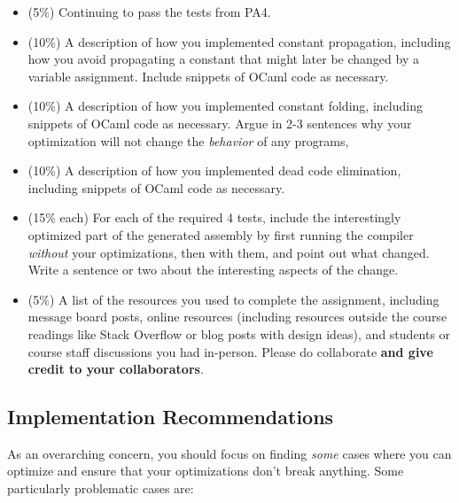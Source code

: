 \documentclass[10pt, oneside]{article}
\begin{document}
\begin{itemize}

  \item (5\%) Continuing to pass the tests from PA4.

  \item (10\%) A description of how you implemented constant propagation,
  including how you avoid propagating a constant that might later be changed
  by a variable assignment. Include snippets of OCaml code as necessary.

  \item (10\%) A description of how you implemented constant folding, including
  snippets of OCaml code as necessary. Argue in 2-3 sentences why your
  optimization will not change the {\it behavior} of any programs, 

  \item (10\%) A description of how you implemented dead code elimination,
  including snippets of OCaml code as necessary.

  \item (15\% each) For each of the required 4 tests, include the
  interestingly optimized part of the generated assembly by first running the
  compiler {\it without} your optimizations, then with them, and point out
  what changed. Write a sentence or two about the interesting aspects of the
  change.

  \item (5\%) A list of the resources you used to complete the assignment,
  including message board posts, online resources (including resources
  outside the course readings like Stack Overflow or blog posts with design
  ideas), and students or course staff discussions you had in-person. Please
  do collaborate {\bf and give credit to your collaborators}.


\end{itemize}

\subsection*{Implementation Recommendations}

As an overarching concern, you should focus on finding {\it some} cases where
you can optimize and ensure that your optimizations don't break anything.
Some particularly problematic cases are:
\end{document}
